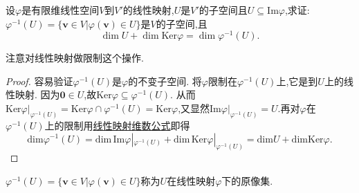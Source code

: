 \documentclass[../../main.tex]{subfiles}%
\begin{document}
\begin{example}
设\(\varphi\)是有限维线性空间\(V\)到\(V'\)的线性映射,\(U\)是\(V'\)的子空间且\(U\subseteq\text{Im}\varphi\),求证:\(\varphi^{-1}(U)=\{\boldsymbol{v}\in V|\varphi(\boldsymbol{v})\in U\}\)是\(V\)的子空间,且
\[
\dim U+\dim\text{Ker}\varphi=\dim\varphi^{-1}(U).
\]
\end{example}
\begin{note}
注意对线性映射做限制这个操作.
\end{note}
\begin{proof}

容易验证\(\varphi^{-1}(U)\)是\(\varphi\)的不变子空间. 将\(\varphi\)限制在\(\varphi^{-1}(U)\)上,它是到\(U\)上的线性映射. 因为\(\boldsymbol{0}\in U\),故\(\text{Ker}\varphi\subseteq\varphi^{-1}(U)\). 从而$\text{Ker}\varphi |_{\varphi ^{-1}\left( U \right)}=\mathrm{Ker}\varphi \cap \varphi ^{-1}\left( U \right) =\mathrm{Ker}\varphi $,又显然$\text{Im}\varphi |_{\varphi ^{-1}\left( U \right)}=U$.再对\(\varphi\)在\(\varphi^{-1}(U)\)上的限制用\hyperref[theorem:值域和核空间维数之和等于原像空间维数]{线性映射维数公式}即得
\[
\mathrm{dim}\varphi ^{-1}\left( U \right) =\mathrm{dim}\,\mathrm{Im}\varphi |_{\varphi ^{-1}\left( U \right)}+\mathrm{dim}\,\mathrm{Ker}\varphi |_{\varphi ^{-1}\left( U \right)}=\mathrm{dim}U+\mathrm{dimKer}\varphi .
\]

\end{proof}
\begin{remark}
\(\varphi^{-1}(U)=\{\boldsymbol{v}\in V|\varphi(\boldsymbol{v})\in U\}\)称为$U$在线性映射$\varphi$下的原像集.
\end{remark}
\end{document}
